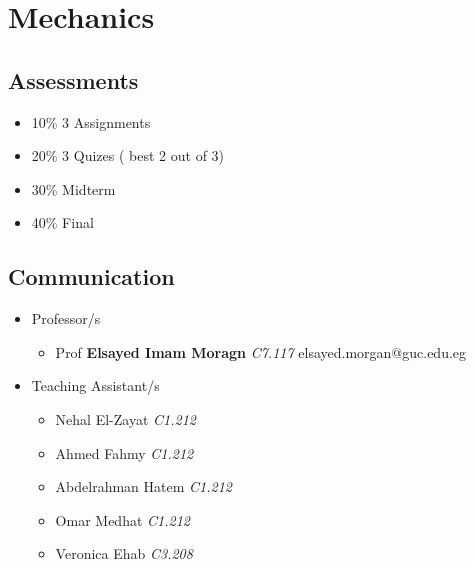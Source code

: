 \documentclass[11pt]{article}
\begin{document}
\section{Mechanics}
\begin{multicols}{2}
\subsection{Assessments}

\begin{itemize}
	\item 10\% 3 Assignments
\item 20\% 3 Quizes ( best 2 out of 3)
\item 30\% Midterm
\item 40\% Final
\end{itemize}
\subsection{Communication}
\begin{itemize}

\item Professor/s 
\begin{itemize}

	\item Prof \textbf{Elsayed Imam Moragn} \textit{C7.117} elsayed.morgan@guc.edu.eg  

\end{itemize}
\item Teaching Assistant/s
\begin{itemize}

\item Nehal El-Zayat \textit{C1.212}
\item Ahmed Fahmy \textit{C1.212}
\item Abdelrahman Hatem \textit{C1.212}
\item Omar Medhat \textit{C1.212}
\item Veronica Ehab \textit{C3.208}
\end{itemize}
\end{itemize}
\end{multicols}
\end{document}
